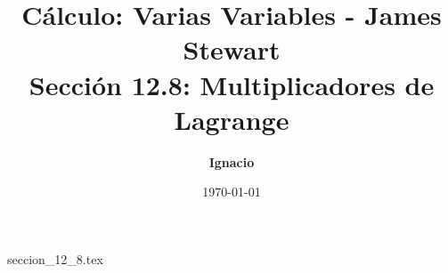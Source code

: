 \documentclass[11pt,spanish,oneside]{report}
\title{\textbf{Cálculo: Varias Variables - James Stewart} \\ \Large Sección 12.8: Multiplicadores de Lagrange}
\author{\textbf{Ignacio}}
\date{\today}
\begin{document}
\maketitle

{seccion_12_8.tex}
\end{document}
